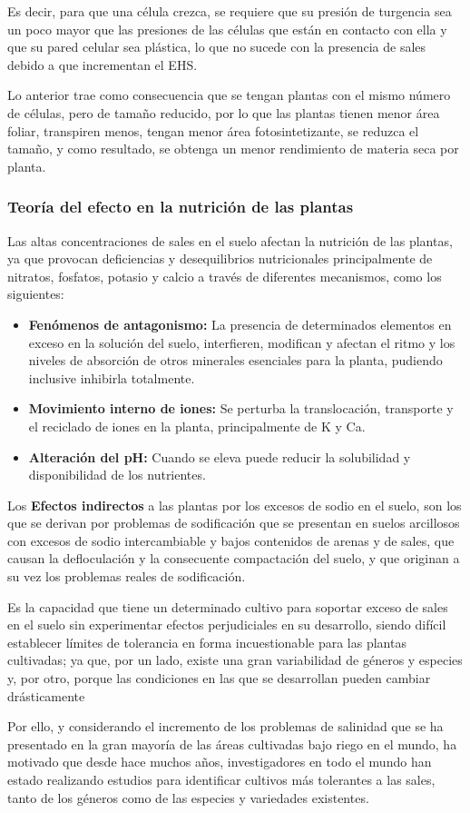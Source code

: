 Es decir, para que una célula crezca, se requiere que su presión de turgencia sea un poco mayor que las presiones de las células que están en contacto con ella y que su pared celular sea plástica, lo que no sucede con la presencia de sales debido a que incrementan el EHS.

Lo anterior trae como consecuencia que se tengan plantas con el mismo número de células, pero de tamaño reducido, por lo que las plantas tienen menor área foliar, transpiren menos, tengan menor área fotosintetizante, se reduzca el tamaño, y como resultado, se obtenga un menor rendimiento de materia seca por planta.

\subsubsection{Teoría del efecto en la nutrición de las plantas}
Las altas concentraciones de sales en el suelo afectan la nutrición de las plantas, ya que provocan deficiencias y desequilibrios nutricionales principalmente de nitratos, fosfatos, potasio y calcio a través de diferentes mecanismos, como los siguientes:
\begin{itemize}
    \item \textbf{Fenómenos de antagonismo:} La presencia de determinados elementos en exceso en la solución del suelo, interfieren, modifican y afectan el ritmo y los niveles de absorción de otros minerales esenciales para la planta, pudiendo inclusive inhibirla totalmente.
    \item \textbf{Movimiento interno de iones:} Se perturba la translocación, transporte y el reciclado de iones en la planta, principalmente de K y Ca.
    \item \textbf{Alteración del pH:} Cuando se eleva puede reducir la solubilidad y disponibilidad de los nutrientes.
\end{itemize}
Los \textbf{Efectos indirectos} a las plantas por los excesos de sodio en el suelo, son los que se derivan por problemas de sodificación que se presentan en suelos arcillosos con excesos de sodio intercambiable y bajos contenidos de arenas y de sales, que causan la defloculación y la consecuente compactación del suelo, y que originan a su vez los problemas reales de sodificación.
\begin{definition}
    Es la capacidad que tiene un determinado cultivo para soportar exceso de sales en el suelo sin experimentar efectos perjudiciales en su desarrollo, siendo difícil establecer límites de tolerancia en forma incuestionable para las plantas cultivadas; ya que, por un lado, existe una gran variabilidad de géneros y especies y, por otro, porque las condiciones en las que se desarrollan pueden cambiar drásticamente
\end{definition}
Por ello, y considerando el incremento de los problemas de salinidad que se ha presentado en la gran mayoría de las áreas cultivadas bajo riego en el mundo, ha motivado que desde hace muchos años, investigadores en todo el mundo han estado realizando estudios para identificar cultivos más tolerantes a las sales, tanto de los géneros como de las especies y variedades existentes.

